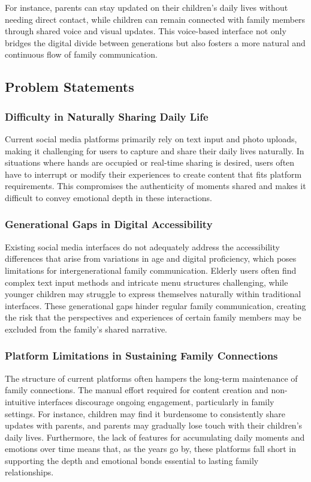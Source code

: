\documentclass[conference]{IEEEtran}
\begin{document}
    For instance, parents can stay updated on their children's daily lives without needing direct contact, while children can remain connected with family members through shared voice and visual updates. This voice-based interface not only bridges the digital divide between generations but also fosters a more natural and continuous flow of family communication.

    \subsection{Problem Statements}
        \subsubsection{Difficulty in Naturally Sharing Daily Life}
        Current social media platforms primarily rely on text input and photo uploads, making it challenging for users to capture and share their daily lives naturally. In situations where hands are occupied or real-time sharing is desired, users often have to interrupt or modify their experiences to create content that fits platform requirements. This compromises the authenticity of moments shared and makes it difficult to convey emotional depth in these interactions.
        
        \subsubsection{Generational Gaps in Digital Accessibility}
        Existing social media interfaces do not adequately address the accessibility differences that arise from variations in age and digital proficiency, which poses limitations for intergenerational family communication. Elderly users often find complex text input methods and intricate menu structures challenging, while younger children may struggle to express themselves naturally within traditional interfaces. These generational gaps hinder regular family communication, creating the risk that the perspectives and experiences of certain family members may be excluded from the family's shared narrative.
        
        \subsubsection{Platform Limitations in Sustaining Family Connections}
        The structure of current platforms often hampers the long-term maintenance of family connections. The manual effort required for content creation and non-intuitive interfaces discourage ongoing engagement, particularly in family settings. For instance, children may find it burdensome to consistently share updates with parents, and parents may gradually lose touch with their children's daily lives. Furthermore, the lack of features for accumulating daily moments and emotions over time means that, as the years go by, these platforms fall short in supporting the depth and emotional bonds essential to lasting family relationships.
\end{document}
